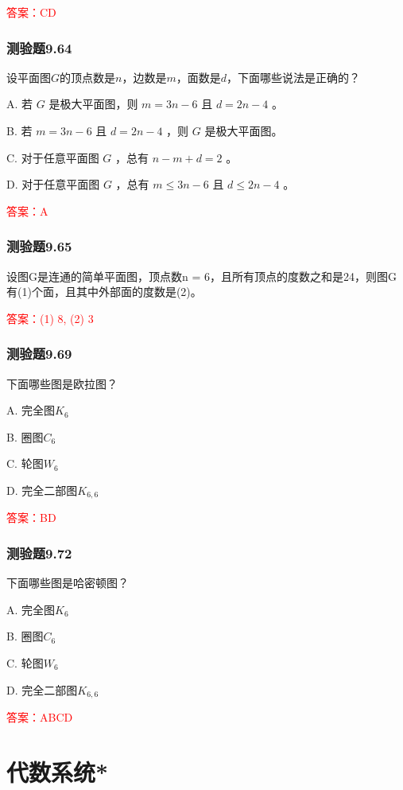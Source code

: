 \documentclass[UTF8, heading=true]{ctexart}
\begin{document}
\textcolor{red}{答案：CD}

\subsubsection{测验题9.64}

设平面图$G$的顶点数是$n$，边数是$m$，面数是$d$，下面哪些说法是正确的？

A. 若 $G$ 是极大平面图，则 $m=3 n-6$ 且 $d=2 n-4$ 。

B. 若 $m=3 n-6$ 且 $d=2 n-4$ ，则 $G$ 是极大平面图。

C. 对于任意平面图 $G$ ，总有 $n-m+d=2$ 。

D. 对于任意平面图 $G$ ，总有 $m \leq 3 n-6$ 且 $d \leq 2 n-4$ 。

\textcolor{red}{答案：A}

\subsubsection{测验题9.65}

设图G是连通的简单平面图，顶点数n = 6，且所有顶点的度数之和是24，则图G有(1)个面，且其中外部面的度数是(2)。

\textcolor{red}{答案：(1) 8, (2) 3}

\subsubsection{测验题9.69}

下面哪些图是欧拉图？

A. 完全图$K_6$

B. 圈图$C_6$

C. 轮图$W_6$

D. 完全二部图$K_{6,6}$

\textcolor{red}{答案：BD}

\subsubsection{测验题9.72}

下面哪些图是哈密顿图？

A. 完全图$K_6$

B. 圈图$C_6$

C. 轮图$W_6$

D. 完全二部图$K_{6,6}$

\textcolor{red}{答案：ABCD}

\clearpage

\section{代数系统*}
\end{document}
